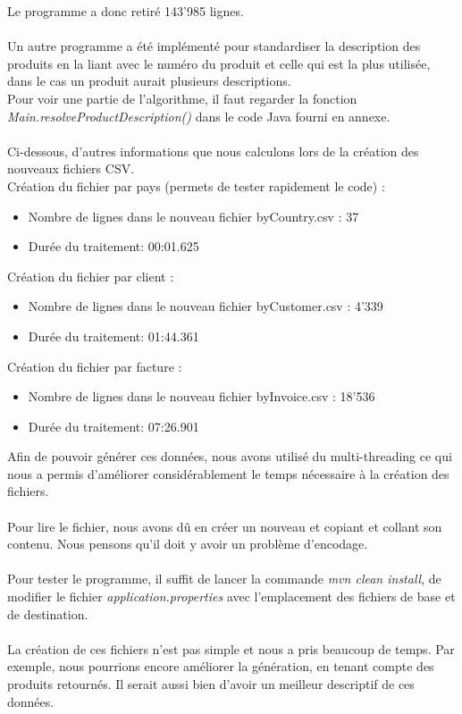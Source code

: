 \documentclass[a4paper]{article}
\begin{document}
\vspace{6pt}
Le programme a donc retiré 143'985 lignes.
\\\\
Un autre programme a été implémenté pour standardiser la description des produits en la liant avec le numéro du produit et celle qui est la plus utilisée, dans le cas un produit aurait plusieurs descriptions. \\
Pour voir une partie de l'algorithme, il faut regarder la fonction \textit{Main.resolveProductDescription()} dans le code Java fourni en annexe.
\\\\
Ci-dessous, d'autres informations que nous calculons lors de la création des nouveaux fichiers CSV.
\\
Création du fichier par pays (permets de tester rapidement le code) :
\begin{itemize}
	\item Nombre de lignes dans le nouveau fichier byCountry.csv : 37
	\item Durée du traitement: 00:01.625
\end{itemize}
\vspace{6pt}

Création du fichier par client :
\begin{itemize}
	\item Nombre de lignes dans le nouveau fichier byCustomer.csv : 4'339
	\item Durée du traitement: 01:44.361
\end{itemize}

\vspace{6pt}

Création du fichier par facture :
\begin{itemize}
	\item Nombre de lignes dans le nouveau fichier byInvoice.csv : 18'536
	\item Durée du traitement: 07:26.901
\end{itemize}

\vspace{6pt}

Afin de pouvoir générer ces données, nous avons utilisé du multi-threading ce qui nous a permis d'améliorer considérablement le temps nécessaire à la création des fichiers.
\\\\
Pour lire le fichier, nous avons dû en créer un nouveau et copiant et collant son contenu. Nous pensons qu'il doit y avoir un problème d'encodage. 
\\\\
Pour tester le programme, il suffit de lancer la commande \textit{mvn clean install}, de modifier le fichier \textit{application.properties} avec l'emplacement des fichiers de base et de destination.
\\\\
La création de ces fichiers n'est pas simple et nous a pris beaucoup de temps. Par exemple, nous pourrions encore améliorer la génération, en tenant compte des produits retournés.
Il serait aussi bien d'avoir un meilleur descriptif de ces données.
\end{document}
